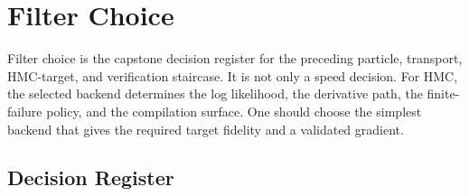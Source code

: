 \chapter{Filter Choice}
\label{ch:bf-filter-choice}

Filter choice is the capstone decision register for the preceding particle,
transport, HMC-target, and verification staircase.  It is not only a speed
decision.  For HMC, the selected backend determines the log likelihood, the
derivative path, the finite-failure policy, and the compilation surface.  One
should choose the simplest backend that gives the required target fidelity and a
validated gradient.

\section{Decision Register}
\label{sec:bf-filter-choice-register}

